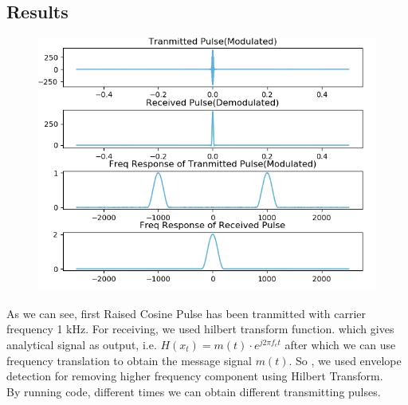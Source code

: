 \documentclass[
	12pt, 
]{fphw_assignment_toc}
\begin{document}
\noindent


\subsection{Results}
\noindent
\begin{figure}[ht!]
 \centering
 \includegraphics[scale=0.7]{../Task2.png}
\end{figure}
\newpage
As we can see, first Raised Cosine Pulse has been tranmitted with carrier frequency 1 kHz. For receiving, we used hilbert transform function. which gives analytical signal as output, i.e. $H(x_t) = m(t)\cdot e^{j 2\pi f_c t}$ after which we can use frequency translation to obtain the message signal $m(t)$. So , we used envelope detection for removing higher frequency component using Hilbert Transform. \\

By running code, different times we can obtain different transmitting pulses.
\printbibliography[heading=bibintoc, title={References}]
\end{document}
